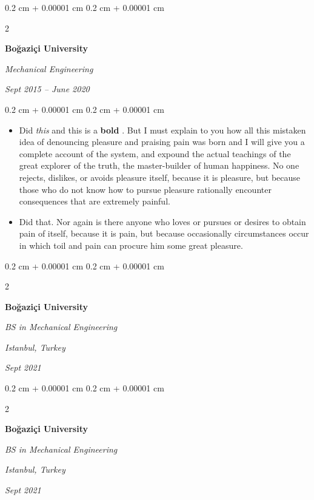 \documentclass[10pt, letterpaper]{article}
\newenvironment{highlights}{
    \begin{itemize}[
        topsep=0.10 cm,
        parsep=0.10 cm,
        partopsep=0pt,
        itemsep=0pt,
        leftmargin=0.4 cm + 10pt
    ]
}{
    \end{itemize}
} %
\newenvironment{onecolentry}{
    \begin{adjustwidth}{
        0.2 cm + 0.00001 cm
    }{
        0.2 cm + 0.00001 cm
    }
}{
    \end{adjustwidth}
} %
\newenvironment{twocolentry}[2][]{
    \onecolentry
    \def\secondColumn{#2}
    \setcolumnwidth{\fill, 4.5 cm}
    \begin{paracol}{2}
}{
    \switchcolumn \raggedleft \secondColumn
    \end{paracol}
    \endonecolentry
} %
\let\hrefWithoutArrow\href
\renewcommand{\href}[2]{\hrefWithoutArrow{#1}{\ifthenelse{\equal{#2}{}}{ }{#2 }\raisebox{.15ex}{\footnotesize \faExternalLink*}}}
\begin{document}
        \vspace{0.2 cm}

        \begin{twocolentry}{
            
            
        \textit{Sept 2015 – June 2020}}
            \textbf{Boğaziçi University}

            \textit{Mechanical Engineering}
        \end{twocolentry}

        \vspace{0.10 cm}
        \begin{onecolentry}
            \begin{highlights}
                \item Did \textit{this} and this is a \textbf{bold} \href{https://example.com}{link}. But I must explain to you how all this mistaken idea of denouncing pleasure and praising pain was born and I will give you a complete account of the system, and expound the actual teachings of the great explorer of the truth, the master-builder of human happiness. No one rejects, dislikes, or avoids pleasure itself, because it is pleasure, but because those who do not know how to pursue pleasure rationally encounter consequences that are extremely painful.
                \item Did that. Nor again is there anyone who loves or pursues or desires to obtain pain of itself, because it is pain, but because occasionally circumstances occur in which toil and pain can procure him some great pleasure.
            \end{highlights}
        \end{onecolentry}


        \vspace{0.2 cm}

        \begin{twocolentry}{
        \textit{Istanbul, Turkey}    
            
        \textit{Sept 2021}}
            \textbf{Boğaziçi University}

            \textit{BS in Mechanical Engineering}
        \end{twocolentry}



        \vspace{0.2 cm}

        \begin{twocolentry}{
        \textit{Istanbul, Turkey}    
            
        \textit{Sept 2021}}
            \textbf{Boğaziçi University}

            \textit{BS in Mechanical Engineering}
        \end{twocolentry}
\end{document}
